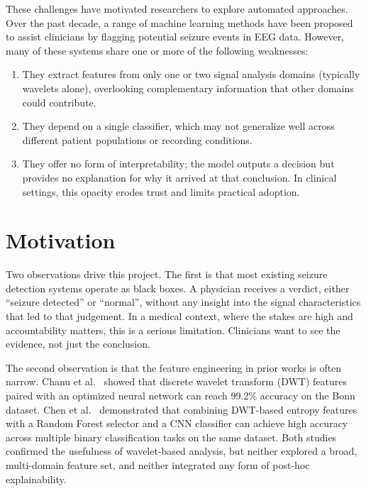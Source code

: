 These challenges have motivated researchers to explore automated approaches. Over the past decade, a range of machine learning methods have been proposed to assist clinicians by flagging potential seizure events in EEG data. However, many of these systems share one or more of the following weaknesses:

\begin{enumerate}[leftmargin=2cm]
    \item They extract features from only one or two signal analysis domains (typically wavelets alone), overlooking complementary information that other domains could contribute.
    \item They depend on a single classifier, which may not generalize well across different patient populations or recording conditions.
    \item They offer no form of interpretability; the model outputs a decision but provides no explanation for why it arrived at that conclusion. In clinical settings, this opacity erodes trust and limits practical adoption.
\end{enumerate}

\section{Motivation}

Two observations drive this project. The first is that most existing seizure detection systems operate as black boxes. A physician receives a verdict, either ``seizure detected'' or ``normal'', without any insight into the signal characteristics that led to that judgement. In a medical context, where the stakes are high and accountability matters, this is a serious limitation. Clinicians want to see the evidence, not just the conclusion.

The second observation is that the feature engineering in prior works is often narrow. Chanu et al.~\citep{chanu2023automated} showed that discrete wavelet transform (DWT) features paired with an optimized neural network can reach 99.2\% accuracy on the Bonn dataset. Chen et al.~\citep{chen2023epileptic} demonstrated that combining DWT-based entropy features with a Random Forest selector and a CNN classifier can achieve high accuracy across multiple binary classification tasks on the same dataset. Both studies confirmed the usefulness of wavelet-based analysis, but neither explored a broad, multi-domain feature set, and neither integrated any form of post-hoc explainability.

